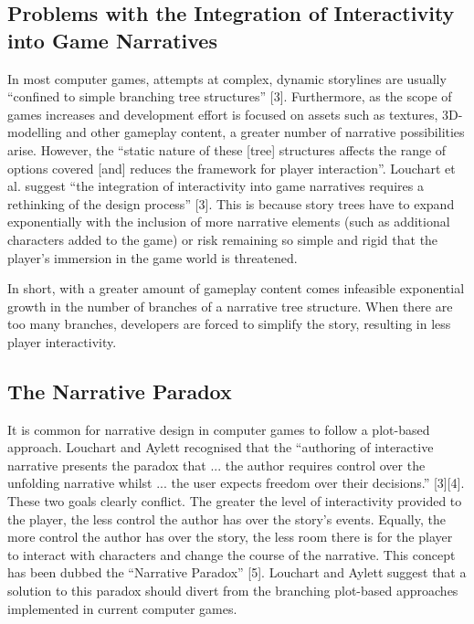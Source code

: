 \documentclass{sig-alternate-05-2015}
\begin{document}
\subsection{Problems with the Integration of Interactivity into Game Narratives}

In most computer games, attempts at complex, dynamic storylines are usually ``confined to simple branching tree structures'' [3]. Furthermore, as the scope of games increases and development effort is focused on assets such as textures, 3D-modelling and other gameplay content, a greater number of narrative possibilities arise. However, the ``static nature of these [tree] structures affects the range of options covered [and] reduces the framework for player interaction''. Louchart et al. suggest ``the integration of interactivity into game narratives requires a rethinking of the design process'' [3]. This is because story trees have to expand exponentially with the inclusion of more narrative elements (such as additional characters added to the game) or risk remaining so simple and rigid that the player's immersion in the game world is threatened.

In short, with a greater amount of gameplay content comes infeasible exponential growth in the number of branches of a narrative tree structure. When there are too many branches, developers are forced to simplify the story, resulting in less player interactivity.

\subsection{The Narrative Paradox}

It is common for narrative design in computer games to follow a plot-based approach. Louchart and Aylett recognised that the ``authoring of interactive narrative presents the paradox that ... the author requires control over the unfolding narrative whilst ... the user expects freedom over their decisions.'' [3][4]. These two goals clearly conflict. The greater the level of interactivity provided to the player, the less control the author has over the story's events. Equally, the more control the author has over the story, the less room there is for the player to interact with characters and change the course of the narrative. This concept has been dubbed the ``Narrative Paradox'' [5]. Louchart and Aylett suggest that a solution to this paradox should divert from the branching plot-based approaches implemented in current computer games.
\end{document}
